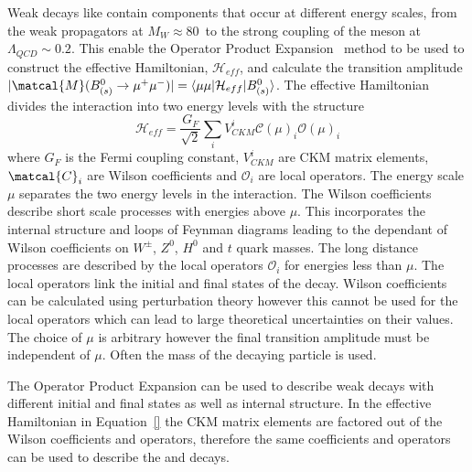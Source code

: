 {{Weak decays like \bmumu contain components that occur at different energy scales, from the weak propagators at $M_W \approx 80$~\gevcc to the strong coupling of the \bsd meson at $\Lambda_{QCD} \sim 0.2$\gev. This enable the Operator Product Expansion~\cite{} method to be used to construct the effective Hamiltonian, $\mathcal{H}_{eff}$, and calculate the transition amplitude $|\matcal{M}(B^0_{(s)} \to \mu^+ \mu^-)| = \langle \mu \mu | \mathcal{H}_{eff} | B^0_{(s)} \rangle$. The effective Hamiltonian divides the interaction into two energy levels with the structure
\begin{equation}
\mathcal{H}_{eff}  = \frac{G_F}{\sqrt{2}} \displaystyle\sum_{i} V^i_{CKM} \mathcal{C}(\mu)_i \mathcal{O}(\mu)_i
\label{sec:eff_hamil_def}
\end{equation}
where $G_F$ is the Fermi coupling constant, $V_{CKM}^i$ are CKM matrix elements, $\matcal{C}_i$ are Wilson coefficients and $\mathcal{O}_i$ are local operators. The energy scale $\mu$ separates the two energy levels in the interaction. The Wilson coefficients describe short scale processes with energies above $\mu$. This incorporates the internal structure and loops of Feynman diagrams leading to the dependant of Wilson coefficients on $W^{\pm}$, $Z^0$, $H^0$ and $t$ quark masses. The long distance processes are described by the local operators $\mathcal{O}_i$ for energies less than $\mu$. The local operators link the initial and final states of the decay.%
Wilson coefficients can be calculated using perturbation theory however this cannot be used for the local operators which can lead to large theoretical uncertainties on their values. The choice of $\mu$ is arbitrary however the final transition amplitude must be independent of $\mu$. Often the mass of the decaying particle is used. 

The Operator Product Expansion can be used to describe weak decays with different initial and final states as well as internal structure. In the effective Hamiltonian in Equation~\ref{} the CKM matrix elements are factored out of the Wilson coefficients and operators, therefore the same coefficients and operators can be used to describe the \bd and \bs decays.

}}
